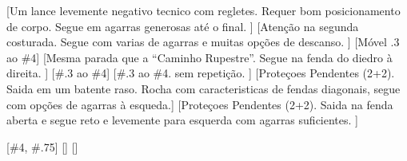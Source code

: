 \begin{CGSectorRoutes}
    [Um lance levemente negativo tecnico com regletes. Requer bom posicionamento de corpo. Segue em agarras generosas até o final.  ]
    [Atenção na segunda costurada. Segue com varias de agarras e muitas opções de descanso. ]
    [Móvel .3 ao \#4]
    [Mesma parada que a ``Caminho Rupestre''. Segue na fenda do diedro à direita. ]
    [\#.3 ao \#4]
    [\#.3 ao \#4. \CGObs sem repetição. ]
    [\CGObs Proteçoes Pendentes (2+2). Saida em um batente raso. Rocha com caracteristicas de fendas diagonais, segue com opções de agarras à esqueda.]
    [\CGObs  Proteçoes Pendentes (2+2). Saida na fenda aberta e segue reto e levemente para esquerda com agarras suficientes. ]
\end{CGSectorRoutes}

\clearpage


\begin{CGSectorRoutes}
    [\#4, \#.75]
    []
    []
\end{CGSectorRoutes}


\clearpage
